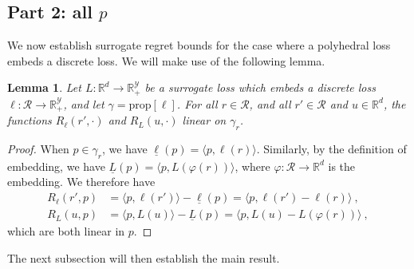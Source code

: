 \documentclass[12pt]{article}
\newcommand{\reals}{\mathbb{R}}
\newcommand{\prop}[1]{\mathrm{prop}[#1]}
\newcommand{\R}{\mathcal{R}}
\newcommand{\Y}{\mathcal{Y}}
\newcommand{\risk}[1]{\underline{#1}}
\newcommand{\inprod}[2]{\langle #1, #2 \rangle}%
\newcommand{\regret}[3]{R_{#1}(#2,#3)}
\newtheorem{lemma}{Lemma}
\begin{document}
\subsection{Part 2: all $p$}

We now establish surrogate regret bounds for the case where a polyhedral loss embeds a discrete loss.
We will make use of the following lemma.

\begin{lemma}\label{lem:regret-linear}
  Let $L:\reals^d \to \reals^\Y_+$ be a surrogate loss which embeds a discrete loss $\ell:\R\to\reals^\Y_+$, and let $\gamma = \prop{\ell}$.
  For all $r\in\R$, and all $r'\in\R$ and $u\in\reals^d$, the functions $\regret{\ell}{r'}{\cdot}$ and $\regret{L}{u}{\cdot}$ linear on $\gamma_r$.
\end{lemma}
\begin{proof}
  When $p\in\gamma_r$, we have $\risk{\ell}(p) = \inprod{p}{\ell(r)}$.
  Similarly, by the definition of embedding, we have $\risk{L}(p) = \inprod{p}{L(\varphi(r))}$, where $\varphi:\R\to\reals^d$ is the embedding.
  We therefore have
  \begin{align*}
    \regret{\ell}{r'}{p} &= \inprod{p}{\ell(r')} - \risk{\ell}(p) = \inprod{p}{\ell(r')-\ell(r)}~,
    \\
    \regret{L}{u}{p} &= \inprod{p}{L(u)} - \risk{L}(p) = \inprod{p}{L(u)-L(\varphi(r))}~,
  \end{align*}
  which are both linear in $p$.  
\end{proof}

The next subsection will then establish the main result.
\end{document}
